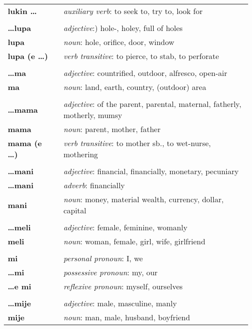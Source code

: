 \begin{supertabular}{p{2,5cm}|ll}
\textbf{lukin \dots} && \textit{auxiliary verb}: to seek to, try to, look for \\ 
 && \\ %
\textbf{\dots lupa} && \textit{adjective}:) hole-, holey, full of holes \\ 
\textbf{lupa} && \textit{noun}: hole, orifice, door, window \\ 
\textbf{lupa (e \dots)} && \textit{verb transitive}: to pierce, to stab, to perforate \\ 
 && \\ %
\textbf{\dots ma} && \textit{adjective}: countrified, outdoor, alfresco, open-air \\ 
\textbf{ma} && \textit{noun}: land, earth, country, (outdoor) area \\ 
 && \\ %
\textbf{\dots mama} && \textit{adjective}: of the parent, parental, maternal, fatherly, motherly, mumsy \\ 
\textbf{mama} && \textit{noun}: parent, mother, father \\ 
\textbf{mama (e \dots)} && \textit{verb transitive}: to mother sb., to wet-nurse, mothering \\ 
 && \\ %
\textbf{\dots mani} && \textit{adjective}: financial, financially, monetary, pecuniary \\ 
\textbf{\dots mani} && \textit{adverb}: financially \\ 
\textbf{mani} && \textit{noun}: money, material wealth, currency, dollar, capital \\ 
 && \\ %
\textbf{\dots meli} && \textit{adjective}: female, feminine, womanly \\ 
\textbf{meli} && \textit{noun}: woman, female, girl, wife, girlfriend \\ 
 && \\ %
\textbf{mi} && \textit{personal pronoun}: I, we  \\ 
\textbf{\dots mi} && \textit{possessive pronoun}: my, our \\  
\textbf{\dots e mi} && \textit{reflexive pronoun}: myself, ourselves  \\ 
 && \\ %
\textbf{\dots mije} && \textit{adjective}: male, masculine, manly \\ 
\textbf{mije} && \textit{noun}: man, male, husband, boyfriend \\ 

\end{supertabular}
